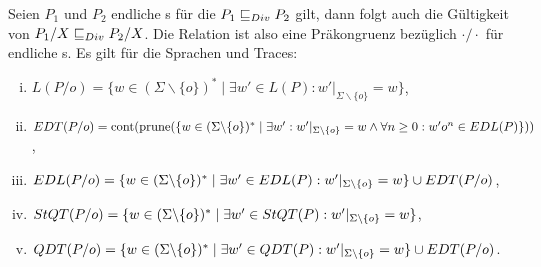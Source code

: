 \begin{Satz}
  \label{DivHidingSatz}
  Seien $P_1$ und $P_2$ endliche \MEIO{}s für die $P_1 \sqsubseteq  _{Div} P_2$ gilt, dann
  folgt auch die Gültigkeit von $P_1/X \sqsubseteq  _{Div} P_2/X$. Die Relation \DRel{} ist
  also eine Präkongruenz bezüglich $\cdot /\cdot$ für endliche \MEIO{}s. Es
  gilt für die Sprachen und Traces:
  \begin{enumerate}[(i)]
    \item $L(P/o) = \{w\in (\Sigma\backslash \{o\})^*\mid \exists w'\in L(P):
      w'|_{\Sigma\backslash \{o\}} = w\}$,
    \item $EDT (P/o) = \mathrm{cont} (\mathrm{prune} (\{w\in (\Sigma\backslash \{o\})^*\mid
      \exists w':w'|_{\Sigma\backslash \{o\}} = w\land \forall n\geq 0:
      w'o^n\in EDL (P)\}))$,
    \item $EDL (P/o) = \{w\in (\Sigma\backslash \{o\})^*\mid \exists w'\in
      EDL(P): w'|_{\Sigma\backslash \{o\}} = w\} \cup EDT (P/o)$,
    \item $StQT (P/o) = \{w\in (\Sigma\backslash \{o\})^*\mid \exists w'\in
      StQT(P): w'|_{\Sigma\backslash \{o\}} = w\}$,
    \item $QDT (P/o) = \{w\in (\Sigma\backslash \{o\})^*\mid \exists w'\in
      QDT(P): w'|_{\Sigma\backslash \{o\}} = w\} \cup EDT (P/o)$.
  \end{enumerate}
\end{Satz}

